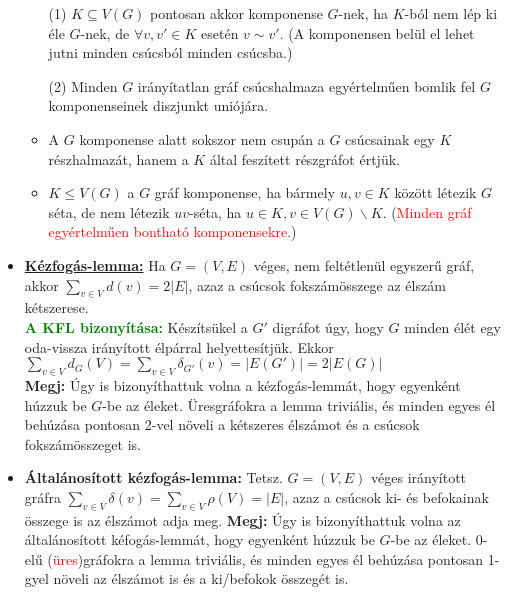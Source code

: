 \documentclass[../../szobeli.tex]{subfiles}
\begin{document}
\begin{itemize}
\begin{itemize}
            \item[(1)] $K \subseteq V(G)$ pontosan akkor komponense $G$-nek, ha $K$-ból nem lép ki éle $G$-nek, de $\forall v,v' \in K$ esetén $v \sim v'$. (A komponensen belül el lehet jutni minden csúcsból minden csúcsba.)
            \item[(2)] Minden $G$ irányítatlan gráf csúcshalmaza egyértelműen bomlik fel $G$ komponenseinek diszjunkt uniójára.
            \item A $G$ komponense alatt sokszor nem csupán a $G$ csúcsainak egy $K$ részhalmazát, hanem a $K$ által feszített részgráfot értjük. 
            \item $K \leq V(G)$ a $G$ gráf komponense, ha bármely $u,v \in K$ között létezik $G$ séta, de nem létezik $uv$-séta, ha $u\in K, v\in V(G)\backslash K$. (\textcolor{red}{Minden gráf egyértelműen bontható komponensekre.})
        \end{itemize}
        \item \underline{\textbf{Kézfogás-lemma:}} Ha $G = (V,E)$ véges, nem feltétlenül egyszerű gráf, akkor $\sum_{v \in V} d(v)=2|E|$, azaz a csúcsok fokszámösszege az élszám kétszerese. \\ \textcolor{green}{\textbf{A KFL bizonyítása:}} Készítsükel a $G'$ digráfot úgy, hogy $G$ minden élét egy oda-vissza irányított élpárral helyettesítjük. Ekkor $\sum_{v \in V} d_G(V) = \sum_{v \in V} \delta_{G'} (v) = |E(G')| = 2|E(G)|$ \\ \textbf{Megj:} Úgy is bizonyíthattuk volna a kézfogás-lemmát, hogy egyenként húzzuk be $G$-be az éleket. Üresgráfokra a lemma triviális, és minden egyes él behúzása pontosan 2-vel növeli a kétszeres élszámot és a csúcsok fokszámösszeget is.
        \item \textbf{Általánosított kézfogás-lemma:} Tetsz. $G = (V,E)$ véges irányított gráfra $\sum_{v \in V} \delta (v) = \sum_{v \in V} \rho (V) = |E|$, azaz a csúcsok ki- és befokainak összege is az élszámot adja meg. \textbf{Megj:} Úgy is bizonyíthattuk volna az általánosított kéfogás-lemmát, hogy egyenként húzzuk be $G$-be az éleket. 0-elű (\textcolor{red}{üres})gráfokra a lemma triviális, és minden egyes él behúzása pontosan 1-gyel növeli az élszámot is és a ki/befokok összegét is.
        
    \end{itemize}
\end{document}
